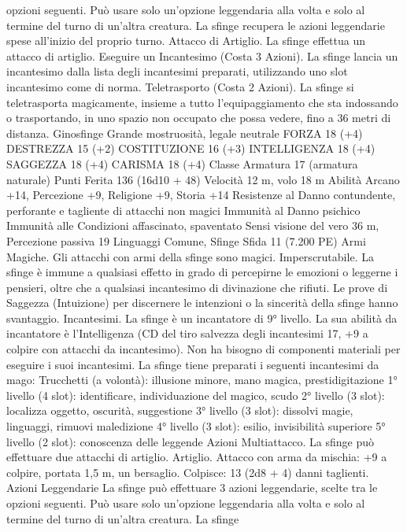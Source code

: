\begin{multicols}{2}
opzioni seguenti. Può usare solo un’opzione leggendaria alla
volta e solo al termine del turno di un’altra creatura. La sfinge
recupera le azioni leggendarie spese all’inizio del proprio turno.
Attacco di Artiglio. La sfinge effettua un attacco di artiglio.
Eseguire un Incantesimo (Costa 3 Azioni). La sfinge lancia un
incantesimo dalla lista degli incantesimi preparati, utilizzando
uno slot incantesimo come di norma.
Teletrasporto (Costa 2 Azioni). La sfinge si teletrasporta
magicamente, insieme a tutto l’equipaggiamento che sta
indossando o trasportando, in uno spazio non occupato che possa
vedere, fino a 36 metri di distanza.
Ginosfinge
Grande mostruosità, legale neutrale
FORZA 18 (+4)
DESTREZZA 15 (+2)
COSTITUZIONE 16 (+3)
INTELLIGENZA 18 (+4)
SAGGEZZA 18 (+4)
CARISMA 18 (+4)
Classe Armatura 17 (armatura naturale)
Punti Ferita 136 (16d10 + 48)
Velocità 12 m, volo 18 m
Abilità Arcano +14, Percezione +9, Religione +9, Storia +14
Resistenze al Danno contundente, perforante e tagliente di
attacchi non magici
Immunità al Danno psichico
Immunità alle Condizioni affascinato, spaventato
Sensi visione del vero 36 m, Percezione passiva 19
Linguaggi Comune, Sfinge
Sfida 11 (7.200 PE)
Armi Magiche. Gli attacchi con armi della sfinge sono magici.
Imperscrutabile. La sfinge è immune a qualsiasi effetto in grado
di percepirne le emozioni o leggerne i pensieri, oltre che a
qualsiasi incantesimo di divinazione che rifiuti. Le prove di
Saggezza (Intuizione) per discernere le intenzioni o la sincerità
della sfinge hanno svantaggio.
Incantesimi. La sfinge è un incantatore di 9° livello. La sua
abilità da incantatore è l’Intelligenza (CD del tiro salvezza degli
incantesimi 17, +9 a colpire con attacchi da incantesimo). Non ha
bisogno di componenti materiali per eseguire i suoi incantesimi.
La sfinge tiene preparati i seguenti incantesimi da mago:
Trucchetti (a volontà): illusione minore, mano magica,
prestidigitazione
1° livello (4 slot): identificare, individuazione del magico, scudo
2° livello (3 slot): localizza oggetto, oscurità, suggestione
3° livello (3 slot): dissolvi magie, linguaggi, rimuovi maledizione
4° livello (3 slot): esilio, invisibilità superiore
5° livello (2 slot): conoscenza delle leggende
Azioni
Multiattacco. La sfinge può effettuare due attacchi di artiglio.
Artiglio. Attacco con arma da mischia: +9 a colpire, portata 1,5
m, un bersaglio.
Colpisce: 13 (2d8 + 4) danni taglienti.
Azioni Leggendarie
La sfinge può effettuare 3 azioni leggendarie, scelte tra le
opzioni seguenti. Può usare solo un’opzione leggendaria alla
volta e solo al termine del turno di un’altra creatura. La sfinge

\end{multicols}
